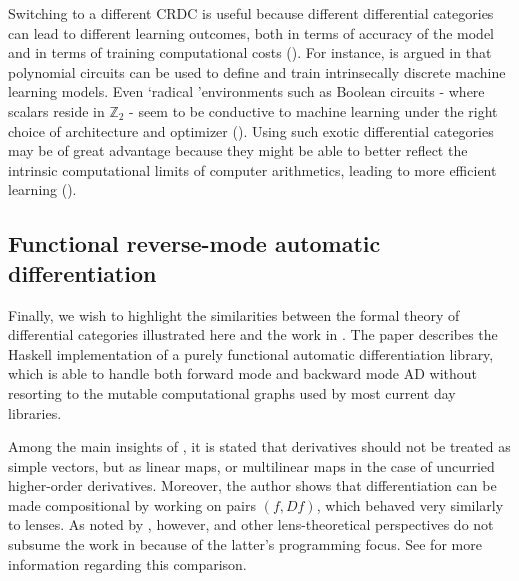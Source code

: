 \documentclass[11pt,a4paper,openright,twoside]{report}
\theoremstyle{plain}
\theoremstyle{definition}
\begin{document}
Switching to a different CRDC is useful because different differential categories can lead to different learning outcomes, both in terms of accuracy of the model and in terms of training computational costs (\cite{wilson2022categories}).
For instance, is argued in \cite{wilson2022categories} that polynomial circuits can be used to define and train intrinsecally discrete machine learning models. Even \lq radical \rq environments such as Boolean circuits - where scalars reside in $\mathbb{Z}_2$ - seem to be conductive to machine learning under the right choice of architecture and optimizer (\cite{wilson2021reverse}). Using such exotic differential categories may be of great advantage because they might be able to better reflect the intrinsic computational limits of computer arithmetics, leading to more efficient learning (\cite{wilson2022categories}). 


\subsection{Functional reverse-mode automatic differentiation}

Finally, we wish to highlight the similarities between the formal theory of differential categories illustrated here and the work in \cite{elliott2018simple}. The paper describes the Haskell implementation of a purely functional automatic differentiation library, which is able to handle both forward mode and backward mode AD without resorting to the mutable computational graphs used by most current day libraries. 

Among the main insights of \cite{elliott2018simple}, it is stated that derivatives should not be treated as simple vectors, but as linear maps, or multilinear maps in the case of uncurried higher-order derivatives. Moreover, the author shows that differentiation can be made compositional by working on pairs $(f, Df)$, which behaved very similarly to lenses. As noted by \cite{shiebler2021category}, however, \cite{cruttwell2022categorical} and other lens-theoretical perspectives do not subsume the work in \cite{elliott2018simple} because of the latter's programming focus. See \cite{shiebler2021category} for more information regarding this comparison.
\end{document}
